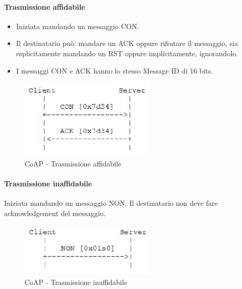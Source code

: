 \documentclass{article}
\begin{document}
\paragraph{Trasmissione affidabile} 
\begin{itemize}
    \item Iniziata mandando un messaggio CON.
    \item Il destinatario può: mandare un ACK oppure rifiutare il messaggio, sia esplicitamente mandando un RST oppure implicitamente, ignorandolo.
    \item I messaggi CON e ACK hanno lo stesso Message ID di 16 bits.
\end{itemize}
\begin{figure}[H]
\centering
\includegraphics[scale=0.6]{figures/coap trasmissione affidabile.png}
\caption{CoAP - Trasmissione affidabile}
\end{figure}

\paragraph{Trasmissione inaffidabile}
Iniziata mandando un messaggio NON. Il destinatario non deve fare acknowledgement del messaggio.
\begin{figure}[H]
\centering
\includegraphics[scale=0.6]{figures/coap trasmissione inaffidabile.png}
\caption{CoAP - Trasmissione inaffidabile}
\end{figure}
\end{document}
